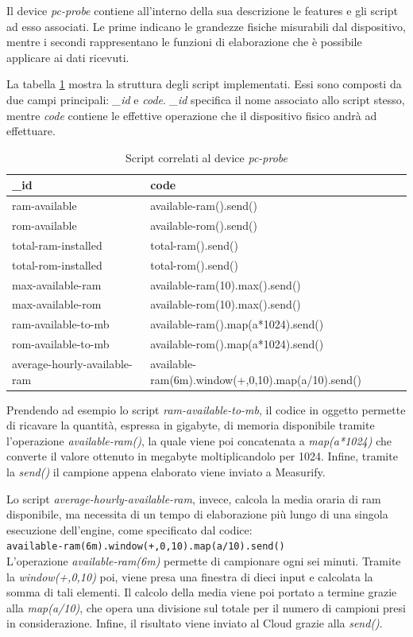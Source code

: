 Il device \textit{pc-probe} contiene all'interno della sua descrizione le features e gli script ad esso associati. Le prime indicano le grandezze fisiche misurabili dal dispositivo, mentre i secondi rappresentano le funzioni di elaborazione che è possibile applicare ai dati ricevuti. 

La tabella \ref{script} mostra la struttura degli script implementati. Essi sono composti da due campi principali: \textit{\_id} e \textit{code}.  \textit{\_id} specifica il nome associato allo script stesso, mentre  \textit{code} contiene le effettive operazione che il dispositivo fisico andrà ad effettuare. 

\begin{table}[H]
	\begin{tabular}{|p{}|p{}|}
		\hline
		\textbf{\_id} & \textbf{code} \\
		\hline
		ram-available & available-ram().send()\\
		\hline
		rom-available & available-rom().send()\\
		\hline
		total-ram-installed & total-ram().send()\\
		\hline
		total-rom-installed & total-rom().send()\\
		\hline
		max-available-ram & available-ram(10).max().send()\\	
		\hline
		max-available-rom & available-rom(10).max().send()\\
		\hline	
		ram-available-to-mb & available-ram().map(a*1024).send()\\
		\hline
		rom-available-to-mb & available-rom().map(a*1024).send()\\
		\hline
		average-hourly-available-ram & available-ram(6m).window(+,0,10).map(a/10).send()\\
		\hline
	\end{tabular}
	\caption{Script correlati al device \textit{pc-probe}}
	\label{script}
\end{table}

Prendendo ad esempio lo script \textit{ram-available-to-mb}, il codice in oggetto permette di ricavare la quantità, espressa in gigabyte, di memoria disponibile tramite l’operazione \textit{available-ram()}, la quale viene poi concatenata a \textit{map(a*1024)} che converte il valore ottenuto in megabyte moltiplicandolo per 1024. Infine, tramite la \textit{send()} il campione appena elaborato viene inviato a Measurify.

Lo script \textit{average-hourly-available-ram}, invece, calcola la media oraria di ram disponibile, ma necessita di un tempo di elaborazione più lungo di una singola esecuzione dell'engine, come specificato dal codice:\\ \texttt{available-ram(6m).window(+,0,10).map(a/10).send()}\\ L’operazione \textit{available-ram(6m)} permette di campionare ogni sei minuti. Tramite la \textit{window(+,0,10)} poi, viene presa una finestra di dieci input e calcolata la somma di tali elementi. Il calcolo della media viene poi portato a termine grazie alla \textit{map(a/10)}, che opera una divisione sul totale per il numero di campioni presi in considerazione. Infine, il risultato viene inviato al Cloud grazie alla \textit{send()}.

